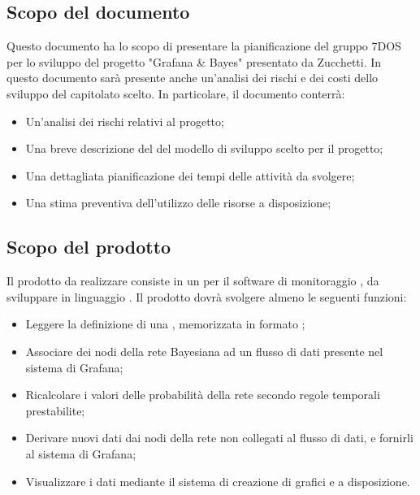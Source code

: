 \subsection{Scopo del documento}
Questo documento ha lo scopo di presentare la pianificazione del gruppo 7DOS per lo sviluppo del progetto "Grafana \& Bayes" presentato da Zucchetti. In questo documento sarà presente anche un'analisi dei rischi e dei costi dello sviluppo del capitolato scelto.
In particolare, il documento conterrà:
\begin{itemize}
	\item Un'analisi dei rischi relativi al progetto;
	\item Una breve descrizione del del modello di sviluppo scelto per il progetto;
	\item Una dettagliata pianificazione dei tempi delle attività da svolgere;
	\item Una stima preventiva dell'utilizzo delle risorse a disposizione;
\end{itemize}


\subsection{Scopo del prodotto}
Il prodotto da realizzare consiste in un  per il software di monitoraggio , da sviluppare in linguaggio . Il prodotto dovrà svolgere almeno le seguenti funzioni:
\begin{itemize}
	\item{Leggere la definizione di una , memorizzata in formato ;}
	\item{Associare dei nodi della rete Bayesiana ad un flusso di dati presente nel sistema di Grafana;}
	\item{Ricalcolare i valori delle probabilità della rete secondo regole temporali prestabilite;}
	\item{Derivare nuovi dati dai nodi della rete non collegati al flusso di dati, e fornirli al sistema di Grafana;}
	\item{Visualizzare i dati mediante il sistema di creazione di grafici e  a disposizione.}
\end{itemize}

